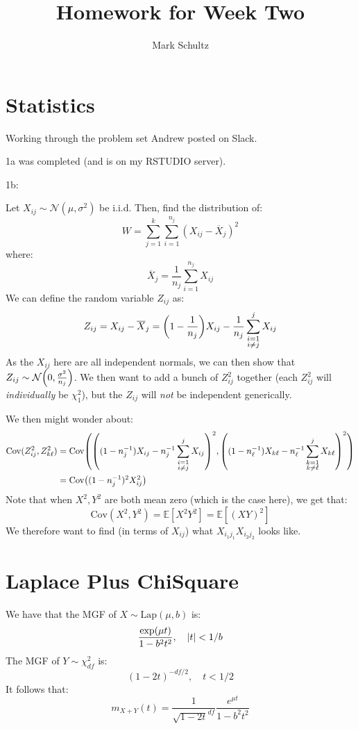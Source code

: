 \documentclass{article}
\theoremstyle{definition}
\begin{document}
\title{Homework for Week Two}
\author{Mark Schultz}
\maketitle
\section{Statistics}
Working through the problem set Andrew posted on Slack.

1a was completed (and is on my RSTUDIO server).

1b:

Let $X_{ij}\sim\mathcal{N}(\mu,\sigma^2)$ be i.i.d.
Then, find the distribution of:
\begin{equation}
W = \sum_{j = 1}^k\sum_{i = 1}^{n_j}(X_{ij} - \overline{X}_j)^2
\end{equation}
where:
\begin{equation}
\overline{X}_j = \frac{1}{n_j}\sum_{i = 1}^{n_j}X_{ij}
\end{equation}
We can define the random variable $Z_{ij}$ as:
\begin{equation}
Z_{ij} = X_{ij} - \overline{X}_j = \pqty{1 - \frac{1}{n_j}}X_{ij} - \frac{1}{n_j}\sum_{\substack{i = 1 \\ i\neq j}}^jX_{ij}
\end{equation}
As the $X_{ij}$ here are all independent normals, we can then show that $Z_{ij}\sim\mathcal{N}\pqty{0,\frac{\sigma^2}{n_j}}$.
We then want to add a bunch of $Z_{ij}^2$ together (each $Z_{ij}^2$ will \emph{individually} be $\chi^2_1$), but the $Z_{ij}$ will \emph{not} be independent generically.

We then might wonder about:
\begin{align*}
\text{Cov}(Z_{ij}^2,Z_{k\ell}^2) &= \text{Cov}\pqty{\pqty{(1 - n_j^{-1})X_{ij} - n_j^{-1}\sum_{\substack{i = 1\\ i\neq j}}^j X_{ij}}^2, \pqty{(1 - n_\ell^{-1})X_{k\ell} - n_\ell^{-1}\sum_{\substack{k = 1\\ k\neq \ell}}^j X_{k\ell}}^2} \\
& = \text{Cov}\pqty{(1-n_j^{-1})^2 X_{ij}^2}
\end{align*}
Note that when $X^2,Y^2$ are both mean zero (which is the case here), we get that:
\begin{equation}
\text{Cov}(X^2, Y^2) = \mathbb{E}[X^2Y^2] = \mathbb{E}[(XY)^2]
\end{equation}
We therefore want to find (in terms of $X_{ij}$) what $X_{i_1j_1}X_{i_2j_2}$ looks like.
\section{Laplace Plus ChiSquare}
We have that the MGF of $X\sim\text{Lap}(\mu, b)$ is:
\begin{equation}
\frac{\exp(\mu t)}{1-b^2t^2},\quad \abs{t} < 1/b
\end{equation}
The MGF of $Y\sim\chi^2_{df}$ is:
\begin{equation}
(1-2t)^{-df/2},\quad t < 1/2
\end{equation}
It follows that:
\begin{equation}
m_{X+Y}(t) = \frac{1}{\sqrt{1-2t}^{df}}\frac{e^{\mu t}}{1-b^2t^2}
\end{equation}
\end{document}
